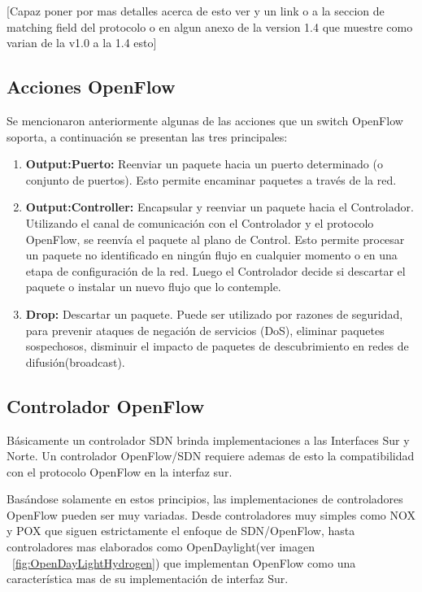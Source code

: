 [Capaz poner por mas detalles acerca de esto ver y un link o a la seccion de matching field del protocolo o en algun anexo de la version 1.4 que muestre como varian de la v1.0 a la 1.4 esto]

\subsection{Acciones OpenFlow}
Se mencionaron anteriormente algunas de las acciones que un switch OpenFlow soporta, a continuación se presentan las tres principales:

\begin{enumerate}
\item \textbf{Output:Puerto:} Reenviar un paquete hacia un puerto determinado (o conjunto de puertos). Esto permite encaminar paquetes a través de la red.
\item \textbf{Output:Controller:} Encapsular y reenviar un paquete hacia el Controlador. Utilizando el canal de comunicación con el Controlador y el protocolo OpenFlow, se reenvía el paquete al plano de Control. Esto permite procesar un paquete no identificado en ningún flujo en cualquier momento o en una etapa de configuración de la red. Luego el Controlador decide si descartar el paquete o instalar un nuevo flujo que lo contemple.
\item \textbf{Drop:} Descartar un paquete. Puede ser utilizado por razones de seguridad, para prevenir ataques de negación de servicios (DoS), eliminar paquetes sospechosos, disminuir el impacto de paquetes de descubrimiento en redes de difusión(broadcast).
\end{enumerate}

\subsection{Controlador OpenFlow}
Básicamente un controlador SDN brinda implementaciones a las Interfaces Sur y Norte. Un controlador OpenFlow/SDN requiere ademas de esto la compatibilidad con el protocolo OpenFlow en la interfaz sur. 

Basándose solamente en estos principios, las implementaciones de controladores OpenFlow pueden ser muy variadas. Desde controladores muy simples como NOX y POX que siguen estrictamente el enfoque de SDN/OpenFlow, hasta controladores mas elaborados como OpenDaylight(ver imagen ~\ref{fig:OpenDayLightHydrogen}) que implementan OpenFlow como una característica mas de su implementaci\'on de interfaz Sur.

